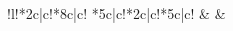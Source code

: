 \begin{center}
\begin{tabular}
\begin{tabular}
\begin{tabular}
\myhline
\end{tabular}
\begin{comment}
\begin{tabular}{!{\color{mbrown}\vrule width 3pt}l!{\color{mbrown}\vrule width 3pt}*{14}{c|}c!{\color{mbrown}\vrule width 3pt}*{2}{*{16}{c|}c!{\color{mbrown}\vrule width 3pt}}}
\hline
\rowcolor{mbrown}
\mcn{16}{|l|}{white}{S47 K (Mo-Fr)} & \mcn{17}{|l|}{white}{S47 K (Sa)} & \mcn{17}{|l|}{white}{S47 K (So)} \\
\hline
BSPF     & 
00:01 & \mbr{20} & 01:01 & 04:01 & \mbr{20} & 05:01 &       & 05:21 &       & 05:48 & \mbr{20} & 20:48 & 21:21 & \mbr{20} & 23:41 &
00:01 & \mbr{20} & 00:41 & \mbr{NV} & 04:32 & 05:01 & \mbr{20} & 06:41 &       & 07:02 &       & 07:28 & \mbr{20} & 19:08 & 19:41 & \mbr{20} & 23:41 &
00:01 & \mbr{20} & 00:41 & \mbr{NV} & 06:32 & 07:01 & \mbr{20} & 08:41 &       & 09:02 &       & 09:28 & \mbr{20} & 19:08 & 19:41 & \mbr{20} & 23:41 \\
BSW      & 
00:07 & \mbr{}   & 01:07 & 04:07 & \mbr{}   & 05:07 & 05:12 & 05:27 & 05:32 & 05:55 & \mbr{}   & 20:55 & 21:27 & \mbr{}   & 23:47 &
00:07 & \mbr{}   & 00:47 & \mbr{}   & 04:38 & 05:07 & \mbr{}   & 06:47 & 06:52 & 07:08 & 07:12 & 07:35 & \mbr{}   & 19:15 & 19:47 & \mbr{}   & 23:47 &
00:07 & \mbr{}   & 00:47 & \mbr{}   & 06:38 & 07:07 & \mbr{}   & 08:47 & 08:52 & 09:08 & 09:12 & 09:35 & \mbr{}   & 19:15 & 19:47 & \mbr{}   & 23:47 \\
BHER     & 
      &          &       &       &          &       & 05:26 &       & 05:46 & 06:06 & \mbr{}   & 21:06 &       &          &       &
      &          &       &          &       &       &          &       & 07:06 &       & 07:26 & 07:46 & \mbr{}   & 19:26 &       &          &       &
      &          &       &          &       &       &          &       & 09:06 &       & 09:26 & 09:46 & \mbr{}   & 19:26 &       &          &       \\
\arrayrulecolor{mbrown}\myhline
\end{tabular}
\end{comment}
\begin{tabular}{!{\color{mbrown}\vrule width 3pt}l!{\color{mbrown}\vrule width 3pt}*{2}{c|}c!{\color{mbrown}\vrule width 2pt height 3pt}*{8}{c|}c!{\color{mbrown}\vrule width 3pt}%
*{5}{c|}c!{\color{mbrown}\vrule width 2pt height 3pt}*{2}{c|}c!{\color{mbrown}\vrule width 3pt}*{5}{c|}c!{\color{mbrown}\vrule width 3pt}}
\hline
{}
 &  &  \\

\end{tabular}
\end{tabular}
\end{tabular}
\end{center}
